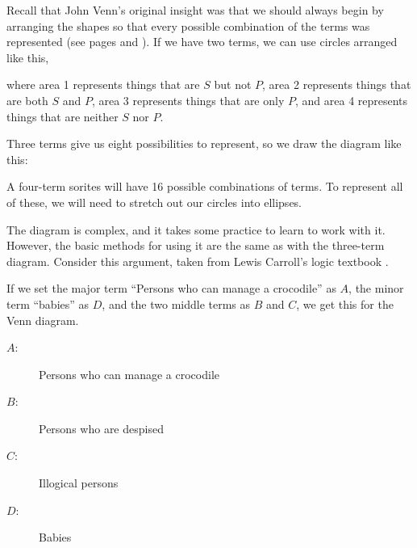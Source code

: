 Recall that John Venn's original insight was that we should always begin by arranging the shapes so that every possible combination of the terms was represented (see pages \pageref{fig:two_circle_venn} and \pageref{fig:three_term_venn_areas}). If we have two terms, we can use circles arranged like this,

\begin{figure}
\centering

\end{figure}

\noindent where area 1 represents things that are $S$ but not $P$, area 2 represents things that are both  $S$ and $P$, area 3 represents things that are only $P$, and area 4 represents things that are neither $S$ nor $P$.

Three terms give us eight possibilities to represent, so we draw the diagram like this:

\begin{figure}
\centering
\end{figure}

A four-term sorites will have 16 possible combinations of terms. To represent all of these, we will need to stretch out our circles into ellipses.



The diagram is complex, and it takes some practice to learn to work with it. However, the basic methods for using it are the same as with the three-term diagram. Consider this argument, taken from Lewis Carroll's logic textbook \citep{Dodgson1896}.

\begin{kormanize}
\end{kormanize}

If we set the major term ``Persons who can manage a crocodile'' as $A$, the minor term ``babies'' as $D$, and the two middle terms as $B$ and $C$, we get this for the Venn diagram.

\begin{description}
\item[$A$:] Persons who can manage a crocodile
\item[$B$:] Persons who are despised
\item[$C$:] Illogical persons
\item[$D$:] Babies
\end{description}
